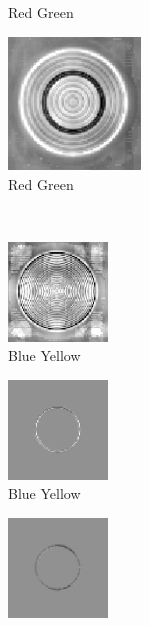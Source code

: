 \documentclass[journal,onecolumn]{IEEEtran}
\begin{document}
{\begin{figure}[H]
\begin{subfigure}[b]{0.25\textwidth}
            \caption{Red Green}
            \label{fig:test-circle-neon-opp-b-rg-mask}
    \end{subfigure}%
    \begin{subfigure}[b]{0.25\textwidth}
            \centering
            \includegraphics[width=100pt, frame]{test-circle-neon-opp-b-rg}
            \caption{Red Green}
            \label{fig:test-circle-neon-opp-b-rg}
    \end{subfigure}\\
    \begin{subfigure}[b]{0.25\textwidth}
            \centering
            \includegraphics[width=100px, frame]{test-circle-neon-opp-a-by}
            \caption{Blue Yellow}
            \label{fig:test-circle-neon-opp-a-by}
    \end{subfigure}%
    \begin{subfigure}[b]{0.25\textwidth}
            \centering
            \includegraphics[width=100px, frame]{test-circle-neon-opp-a-by-mask}
            \caption{Blue Yellow}
            \label{fig:test-circle-neon-opp-a-by-mask}
    \end{subfigure}%
    \begin{subfigure}[b]{0.25\textwidth}
            \centering
            \includegraphics[width=100px, frame]{test-circle-neon-opp-b-by-mask}

\end{subfigure}
\end{figure}}
\end{document}
